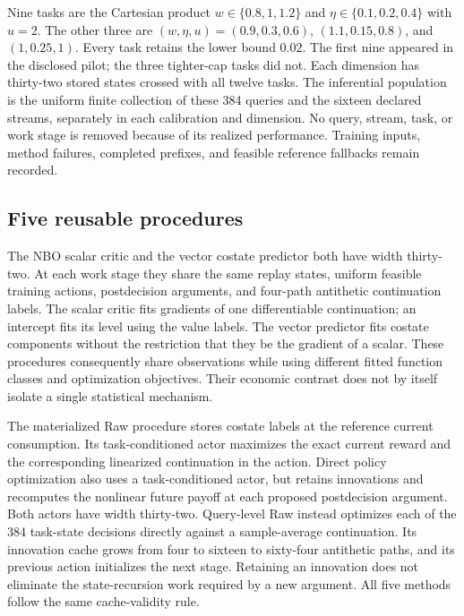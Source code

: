 Nine tasks are the Cartesian product
$w\in\{0.8,1,1.2\}$ and $\eta\in\{0.1,0.2,0.4\}$ with $u=2$.
The other three are $(w,\eta,u)=(0.9,0.3,0.6)$,
$(1.1,0.15,0.8)$, and $(1,0.25,1)$. Every task retains the lower bound
$0.02$. The first nine appeared in the disclosed pilot; the three tighter-cap
tasks did not. Each dimension has thirty-two stored states crossed with all
twelve tasks. The inferential population is the uniform finite collection
of these 384 queries and the sixteen declared streams, separately in each
calibration and dimension. No query, stream, task, or work stage is removed
because of its realized performance. Training inputs, method failures,
completed prefixes, and feasible reference fallbacks remain recorded.

\subsection{Five reusable procedures}
The NBO scalar critic and the vector costate predictor both have width
thirty-two. At each work stage they share the same replay states, uniform
feasible training actions, postdecision arguments, and four-path antithetic
continuation labels. The scalar critic fits gradients of one differentiable
continuation; an intercept fits its level using the value labels. The vector
predictor fits costate components without the restriction that they be the
gradient of a scalar. These procedures consequently share observations while
using different fitted function classes and optimization objectives. Their
economic contrast does not by itself isolate a single statistical mechanism.

The materialized Raw procedure stores costate labels at the reference current
consumption. Its task-conditioned actor maximizes the exact current reward
and the corresponding linearized continuation in the action. Direct policy
optimization also uses a task-conditioned actor, but retains innovations and
recomputes the nonlinear future payoff at each proposed postdecision argument.
Both actors have width thirty-two. Query-level Raw instead optimizes each of
the 384 task-state decisions directly against a sample-average continuation.
Its innovation cache grows from four to sixteen to sixty-four antithetic
paths, and its previous action initializes the next stage. Retaining an
innovation does not eliminate the state-recursion work required by a new
argument. All five methods follow the same cache-validity rule.

